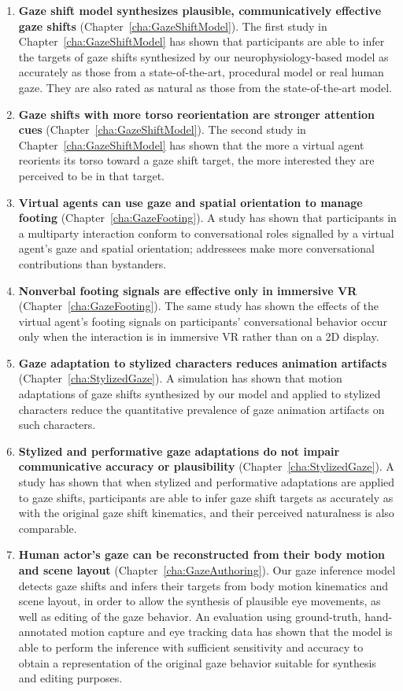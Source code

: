 \begin{enumerate}
\item \textbf{Gaze shift model synthesizes plausible, communicatively effective gaze shifts} (Chapter~\ref{cha:GazeShiftModel}). The first study in Chapter~\ref{cha:GazeShiftModel} has shown that participants are able to infer the targets of gaze shifts synthesized by our neurophysiology-based model as accurately as those from a state-of-the-art, procedural model or real human gaze. They are also rated as natural as those from the state-of-the-art model.
\item \textbf{Gaze shifts with more torso reorientation are stronger attention cues} (Chapter~\ref{cha:GazeShiftModel}). The second study in Chapter~\ref{cha:GazeShiftModel} has shown that the more a virtual agent reorients its torso toward a gaze shift target, the more interested they are perceived to be in that target.
\item \textbf{Virtual agents can use gaze and spatial orientation to manage footing} (Chapter~\ref{cha:GazeFooting}). A study has shown that participants in a multiparty interaction conform to conversational roles signalled by a virtual agent's gaze and spatial orientation; addressees make more conversational contributions than bystanders.
\item \textbf{Nonverbal footing signals are effective only in immersive VR} (Chapter~\ref{cha:GazeFooting}). The same study has shown the effects of the virtual agent's footing signals on participants' conversational behavior occur only when the interaction is in immersive VR rather than on a 2D display.
\item \textbf{Gaze adaptation to stylized characters reduces animation artifacts} (Chapter~\ref{cha:StylizedGaze}). A simulation has shown that motion adaptations of gaze shifts synthesized by our model and applied to stylized characters reduce the quantitative prevalence of gaze animation artifacts on such characters.
\item \textbf{Stylized and performative gaze adaptations do not impair communicative accuracy or plausibility} (Chapter~\ref{cha:StylizedGaze}). A study has shown that when stylized and performative adaptations are applied to gaze shifts, participants are able to infer gaze shift targets as accurately as with the original gaze shift kinematics, and their perceived naturalness is also comparable.
\item \textbf{Human actor's gaze can be reconstructed from their body motion and scene layout} (Chapter~\ref{cha:GazeAuthoring}). Our gaze inference model detects gaze shifts and infers their targets from body motion kinematics and scene layout, in order to allow the synthesis of plausible eye movements, as well as editing of the gaze behavior. An evaluation using ground-truth, hand-annotated motion capture and eye tracking data has shown that the model is able to perform the inference with sufficient sensitivity and accuracy to obtain a representation of the original gaze behavior suitable for synthesis and editing purposes.

\end{enumerate}
